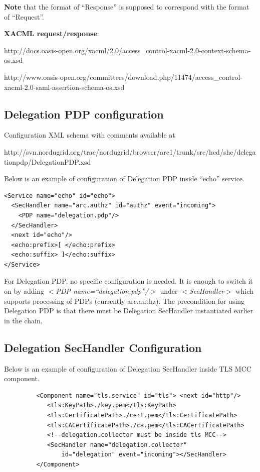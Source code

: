 \documentclass{article}                            %
\begin{document}
\textbf{Note} that the format of ``Response'' is supposed to correspond with the format of ``Request''.

\textbf{XACML request/response}:

http://docs.oasis-open.org/xacml/2.0/access\_control-xacml-2.0-context-schema-os.xsd

http://www.oasis-open.org/committees/download.php/11474/access\_control-xacml-2.0-saml-assertion-schema-os.xsd


\subsection{Delegation PDP configuration} %
\label{subsec:delegpdp_conf}
Configuration XML schema with comments available at

http://svn.nordugrid.org/trac/nordugrid/browser/arc1/trunk/src/hed/shc/delegationpdp/DelegationPDP.xsd

Below is an example of configuration of Delegation PDP inside ``echo'' service.

\begin{verbatim}
<Service name="echo" id="echo">
  <SecHandler name="arc.authz" id="authz" event="incoming">
    <PDP name="delegation.pdp"/>
  </SecHandler>
  <next id="echo"/>
  <echo:prefix>[ </echo:prefix>
  <echo:suffix> ]</echo:suffix>
</Service>
\end{verbatim}

For Delegation PDP, no specific configuration is needed. It is enough to switch it on by adding \textit{$<$PDP name=``delegation.pdp''/$>$} under \textit{$<$SecHandler$>$} which supports processing of PDPs (currently arc.authz).
The precondition for using Delegation PDP is that there must be Delegation SecHandler instantiated earlier in the chain.


\subsection{Delegation SecHandler Configuration} %
\label{subsec:deleg_sechandler_conf}
Below is an example of configuration of Delegation SecHandler inside TLS MCC component.

\begin{verbatim}
         <Component name="tls.service" id="tls"> <next id="http"/>
            <tls:KeyPath>./key.pem</tls:KeyPath>
            <tls:CertificatePath>./cert.pem</tls:CertificatePath>
            <tls:CACertificatePath>./ca.pem</tls:CACertificatePath>
            <!--delegation.collector must be inside tls MCC-->
            <SecHandler name="delegation.collector"
                id="delegation" event="incoming"></SecHandler>
         </Component>
\end{verbatim}
\end{document}
